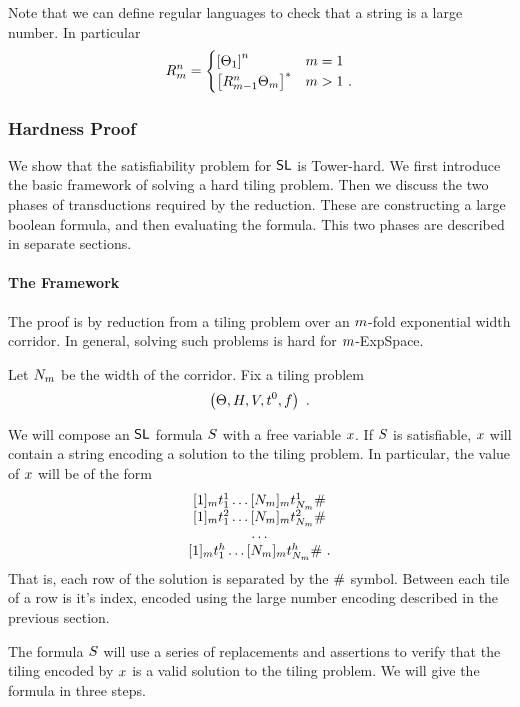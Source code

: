 Note that we can define regular languages to check that a string is a
large number. In particular
\[
    R^{n}_{m} =
    \begin{cases}
        \left[\Theta_{1}\right]^n & m = 1 \\
        \left[
            R^{n}_{m-1}
            \Theta_{m}
        \right]^\ast  & m > 1 \ .
    \end{cases}
\]

\subsubsection{Hardness Proof}

We show that the satisfiability problem for $\mathsf{SL}$ is
Tower-hard. We first introduce the basic framework of solving a hard
tiling problem. Then we discuss the two phases of transductions required
by the reduction. These are constructing a large boolean formula, and
then evaluating the formula. This two phases are described in separate
sections.

\paragraph{The Framework}

The proof is by reduction from a tiling problem over an
$m$-fold exponential width corridor. In general, solving such
problems is hard for $m$-ExpSpace.

Let $N_{m}$ be the width of the corridor. Fix a tiling
problem
\[
    \tup{\tiles, \hrel, \vrel, \inittile, \fintile} \ .
\]

We will compose an $\mathsf{SL}$ formula $S$ with a free
variable $x$. If $S$ is satisfiable, $x$ will contain a
string encoding a solution to the tiling problem. In particular, the
value of $x$ will be of the form
\[
    \begin{array}{c}
        \fullrow{1} \spacer \\
        \fullrow{2} \spacer \\
        \ldots \\
        \fullrow{\tileheight} \spacer \ .
    \end{array}
\]
That is, each row of the solution is separated by the $\#$ symbol.
Between each tile of a row is it's index, encoded using the large number
encoding described in the previous section.

The formula $S$ will use a series of replacements and assertions to verify
that the tiling encoded by $x$ is a valid solution to the tiling problem.
We will give the formula in three steps.

